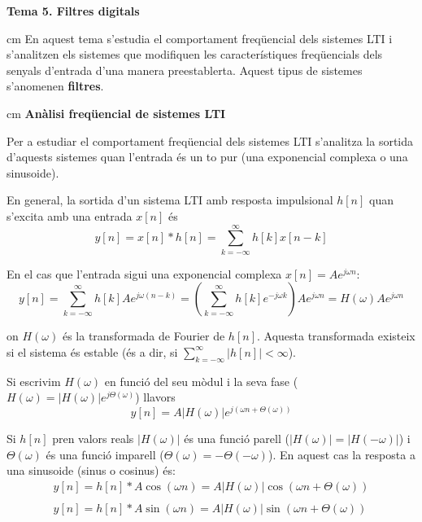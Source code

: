 \documentclass{article}
\begin{document}
\textbf{\Large Tema 5. Filtres digitals}

 cm
En aquest tema s'estudia el comportament freqüencial dels sistemes LTI 
i s'analitzen els sistemes que modifiquen les característiques freqüencials 
dels senyals d'entrada d'una manera preestablerta. Aquest tipus de sistemes s'anomenen \textbf{filtres}. 

 cm
\noindent
\textbf{\large Anàlisi freqüencial de sistemes LTI}


Per a estudiar el comportament freqüencial dels sistemes LTI s'analitza
la sortida d'aquests sistemes quan l'entrada és un to pur (una exponencial 
complexa o una sinusoide).

En general, la sortida d'un sistema LTI amb resposta impulsional $h[n]$ 
quan s'excita amb una entrada $x[n]$ és
\[
y[n]=x[n] * h[n] = \sum_{k=-\infty}^\infty h[k] x[n-k]
\]

En el cas que l'entrada sigui una exponencial complexa $x[n]=A e^{j \omega n}$:
\[
y[n]=\sum_{k=-\infty}^\infty h[k] A e^{j \omega (n-k)}=\left( \sum_{k=-\infty}^\infty h[k] e^{-j \omega k} \right) A e^{j \omega n}=
H(\omega) A e^{j \omega n}
\]

\noindent
on $H(\omega)$ és la transformada de Fourier de $h[n]$. Aquesta transformada existeix si el sistema és estable 
(és a dir, si $\sum_{k=-\infty}^\infty |h[n]| < \infty$).

Si escrivim $H(\omega)$ en funció del seu mòdul i la seva fase ($H(\omega)=|H(\omega)| e^{j \Theta(\omega)}$) llavors
\begin{equation}
y[n]=A |H(\omega)| e^{j (\omega n + \Theta(\omega))}
\end{equation}

Si $h[n]$ pren valors reals $|H(\omega)|$ és una funció parell ($|H(\omega)|=|H(-\omega)|$) i 
$\Theta(\omega)$ és una funció imparell ($\Theta(\omega)=-\Theta(-\omega)$).
En aquest cas la resposta a una sinusoide (sinus o cosinus) és:
\begin{equation}
\begin{array}{l}
y[n]=h[n] * A \cos(\omega n)=A |H(\omega)| \cos(\omega n + \Theta(\omega)) \\ \\
y[n]=h[n] * A \sin(\omega n)=A |H(\omega)| \sin(\omega n + \Theta(\omega)) 
\end{array}
\end{equation}
\end{document}
